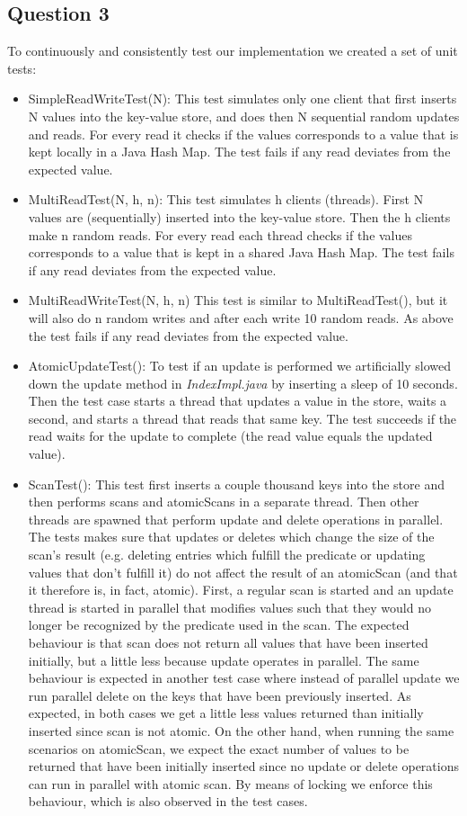 \documentclass[12pt,a4paper]{article}
\begin{document}
\subsection*{Question 3}
\label{sec:pq3}
To continuously and consistently test our implementation we created a set of unit tests:
\begin{itemize}
\item SimpleReadWriteTest(N): This test simulates only one client that first inserts N values into the key-value store, and does then N sequential random updates and reads. For every read it checks if the values corresponds to a value that is kept locally in a Java Hash Map. The test fails if any read deviates from the expected value.
\item MultiReadTest(N, h, n): This test simulates h clients (threads). First N values are (sequentially) inserted into the key-value store. Then the h clients make n random reads. For every read each thread checks if the values corresponds to a value that is kept in a shared Java Hash Map. The test fails if any read deviates from the expected value.
\item MultiReadWriteTest(N, h, n) This test is similar to MultiReadTest(), but it will also do n random writes and after each write 10 random reads. As above the test fails if any read deviates from the expected value.
\item AtomicUpdateTest(): To test if an update is performed we artificially slowed down the update method in \emph{IndexImpl.java} by inserting a sleep of 10 seconds. Then the test case starts a thread that updates a value in the store, waits a second, and starts a thread that reads that same key. The test succeeds if the read waits for the update to complete (the read value equals the updated value).
\item ScanTest(): This test first inserts a couple thousand keys into the store and then performs scans and atomicScans in a separate thread. Then other threads are spawned that perform update and delete operations in parallel. The tests makes sure that updates or deletes which change the size of the scan's result (e.g. deleting entries which fulfill the predicate or updating values that don't fulfill it) do not affect the result of an atomicScan (and that it therefore is, in fact, atomic). First, a regular scan is started and an update thread is started in parallel that modifies values such that they would no longer be recognized by the predicate used in the scan. The expected behaviour is that scan does not return all values that have been inserted initially, but a little less because update operates in parallel. The same behaviour is expected in another test case where instead of parallel update we run parallel delete on the keys that have been previously inserted. As expected, in both cases we get a little less values returned than initially inserted since scan is not atomic. On the other hand, when running the same scenarios on atomicScan, we expect the exact number of values to be returned that have been initially inserted since no update or delete operations can run in parallel with atomic scan. By means of locking we enforce this behaviour, which is also observed in the test cases.

\end{itemize}
\end{document}
